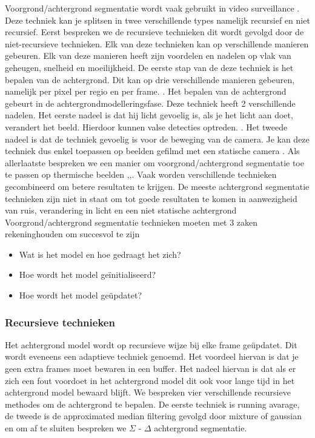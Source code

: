 Voorgrond/achtergrond segmentatie wordt vaak gebruikt in video surveillance \cite{bibBET3}. Deze techniek kan je splitsen in twee verschillende types namelijk recursief en niet recursief. Eerst bespreken we de recursieve technieken dit wordt gevolgd door de niet-recursieve technieken. Elk van deze technieken kan op verschillende manieren gebeuren. Elk van deze manieren heeft zijn voordelen en nadelen op vlak van geheugen, snelheid en moeilijkheid. De eerste stap van de deze techniek is het bepalen van de achtergrond. Dit kan op drie verschillende manieren gebeuren, namelijk per pixel per regio en per frame. \cite{bibBET4}.  Het bepalen  van de achtergrond gebeurt in de achtergrondmodelleringsfase. Deze techniek heeft 2 verschillende nadelen. Het eerste nadeel is dat hij licht gevoelig is, als je het licht aan doet, verandert het beeld. Hierdoor kunnen valse detecties optreden.  \cite{bibBET4}. Het tweede nadeel is dat de techniek gevoelig is voor de beweging van de camera. Je kan deze techniek dus enkel toepassen op beelden gefilmd met een statische camera \cite{bibBET7}. Als allerlaatste bespreken we een manier om voorgrond/achtergrond segmentatie toe te passen op thermische beelden \cite{bibBET5},\cite{bibBEt},\cite{bibBET2}. Vaak worden verschillende technieken gecombineerd om betere resultaten te krijgen. De meeste achtergrond segmentatie technieken  zijn niet in staat om tot goede resultaten te komen in aanwezigheid van ruis, verandering in licht en een niet statische achtergrond \cite{bibBET9}\\
Voorgrond/achtergrond segmentatie technieken moeten met 3 zaken rekeninghouden om succesvol te zijn
\begin{itemize}
	\item Wat is het model en hoe gedraagt het zich?
	\item Hoe wordt het model ge\"initialiseerd?
	\item Hoe wordt het model ge\"updatet?
\end{itemize}
\cite{bibBET8}


\subsubsection{Recursieve technieken}
\label{refRT}
Het achtergrond model wordt op recursieve wijze bij elke frame ge\"updatet. Dit wordt eveneens een adaptieve techniek genoemd.  Het voordeel hiervan is dat je geen extra frames moet bewaren in een buffer. Het nadeel hiervan is dat als er zich een fout voordoet in het achtergrond model dit ook voor lange tijd in het achtergrond model bewaard blijft. We bespreken vier verschillende recursieve methodes om de achtergrond te bepalen. De eerste techniek is running avarage,  de tweede is de approximated median filtering gevolgd door mixture of gaussian en om af te sluiten bespreken we $\Sigma$ - $\Delta$ achtergrond segmentatie.

